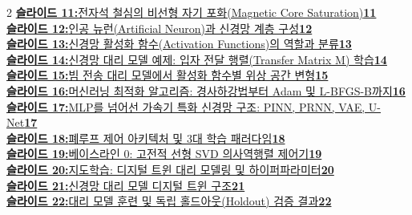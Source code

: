 \documentclass[11pt,a4paper]{article}
\begin{document}
{\begin{multicols}{2}
\noindent\hyperlink{slide.11}{\textbf{\color{primaryblue}슬라이드 11:}\enspace 전자석 철심의 비선형 자기 포화(Magnetic Core Saturation)\enspace\dotfill\enspace\textbf{11}} \\[0.22em]
\noindent\hyperlink{slide.12}{\textbf{\color{primaryblue}슬라이드 12:}\enspace 인공 뉴런(Artificial Neuron)과 신경망 계층 구성\enspace\dotfill\enspace\textbf{12}} \\[0.22em]
\noindent\hyperlink{slide.13}{\textbf{\color{primaryblue}슬라이드 13:}\enspace 신경망 활성화 함수(Activation Functions)의 역할과 분류\enspace\dotfill\enspace\textbf{13}} \\[0.22em]
\noindent\hyperlink{slide.14}{\textbf{\color{primaryblue}슬라이드 14:}\enspace 신경망 대리 모델 예제: 입자 전달 행렬(Transfer Matrix M) 학습\enspace\dotfill\enspace\textbf{14}} \\[0.22em]
\noindent\hyperlink{slide.15}{\textbf{\color{primaryblue}슬라이드 15:}\enspace 빔 전송 대리 모델에서 활성화 함수별 위상 공간 변형\enspace\dotfill\enspace\textbf{15}} \\[0.22em]
\noindent\hyperlink{slide.16}{\textbf{\color{primaryblue}슬라이드 16:}\enspace 머신러닝 최적화 알고리즘: 경사하강법부터 Adam 및 L-BFGS-B까지\enspace\dotfill\enspace\textbf{16}} \\[0.22em]
\noindent\hyperlink{slide.17}{\textbf{\color{primaryblue}슬라이드 17:}\enspace MLP를 넘어선 가속기 특화 신경망 구조: PINN, PRNN, VAE, U-Net\enspace\dotfill\enspace\textbf{17}} \\[0.22em]
\noindent\hyperlink{slide.18}{\textbf{\color{primaryblue}슬라이드 18:}\enspace 폐루프 제어 아키텍처 및 3대 학습 패러다임\enspace\dotfill\enspace\textbf{18}} \\[0.22em]
\noindent\hyperlink{slide.19}{\textbf{\color{primaryblue}슬라이드 19:}\enspace 베이스라인 0: 고전적 선형 SVD 의사역행렬 제어기\enspace\dotfill\enspace\textbf{19}} \\[0.22em]
\noindent\hyperlink{slide.20}{\textbf{\color{primaryblue}슬라이드 20:}\enspace 지도학습: 디지털 트윈 대리 모델링 및 하이퍼파라미터\enspace\dotfill\enspace\textbf{20}} \\[0.22em]
\noindent\hyperlink{slide.21}{\textbf{\color{primaryblue}슬라이드 21:}\enspace 신경망 대리 모델 디지털 트윈 구조\enspace\dotfill\enspace\textbf{21}} \\[0.22em]
\noindent\hyperlink{slide.22}{\textbf{\color{primaryblue}슬라이드 22:}\enspace 대리 모델 훈련 및 독립 홀드아웃(Holdout) 검증 결과\enspace\dotfill\enspace\textbf{22}} \\[0.22em]

\end{multicols}}
\end{document}
